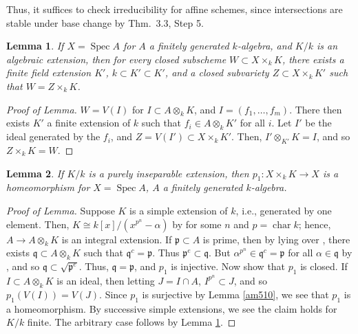 \documentclass[12pt,letterpaper]{article}
\newtheorem{lemma}{Lemma}
\theoremstyle{definition}
\theoremstyle{remark}
\numberwithin{equation}{section}
\numberwithin{figure}{problem}
\DeclareMathOperator{\Spec}{Spec}
\DeclareMathOperator{\Char}{char}
\begin{document}
Thus, it suffices to check irreducibility for affine schemes, since intersections are stable under base change by Thm.~3.3, Step 5.
\begin{lemma}\label{finext}
  If $X = \Spec A$ for $A$ a finitely generated $k$-algebra, and $K/k$ is an algebraic extension, then for every closed subscheme $W \subset X \times_k K$, there exists a finite field extension $K'$, $k \subset K' \subset K'$, and a closed subvariety $Z \subset X \times_k K'$ such that $W = Z \times_k K$.
\end{lemma}
\begin{proof}[Proof of Lemma]
  $W = V(I)$ for $I \subset A \otimes_k K$, and $I = (f_1,\ldots,f_m)$. There then exists $K'$ a finite extension of $k$ such that $f_i \in A \otimes_k K'$ for all $i$. Let $I'$ be the ideal generated by the $f_i$, and $Z = V(I') \subset X \times_k K'$. Then, $I' \otimes_{K'} K = I$, and so $Z \times_k K = W$.
\end{proof}
\begin{lemma}\label{purinsep}
  If $K/k$ is a purely inseparable extension, then $p_1\colon X \times_k K \to X$ is a homeomorphism for $X = \Spec A$, $A$ a finitely generated $k$-algebra.
\end{lemma}
\begin{proof}[Proof of Lemma]
  Suppose $K$ is a simple extension of $k$, i.e., generated by one element. Then, $K \cong k[x]/(x^{p^n}-\alpha)$ by \cite[Thm.~19.10]{Isa09} for some $n$ and $p = \Char k$; hence, $A \to A \otimes_k K$ is an integral extension. If $\mathfrak{p} \subset A$ is prime, then by lying over \cite[Thm.~5.10]{AM69}, there exists $\mathfrak{q} \subset A \otimes_k K$ such that $\mathfrak{q}^c = \mathfrak{p}$. Thus $\mathfrak{p}^e \subset \mathfrak{q}$. But $\alpha^{p^n} \in \mathfrak{q}^c = \mathfrak{p}$ for all $\alpha \in \mathfrak{q}$ by \cite[Thm.~19.10]{Isa09}, and so $\mathfrak{q} \subset \sqrt{\mathfrak{p}^e}$. Thus, $\mathfrak{q} = \mathfrak{p}$, and $p_1$ is injective. Now show that $p_1$ is closed. If $I \subset A \otimes_k K$ is an ideal, then letting $J = I \cap A$, $I^{p^n} \subset J$, and so $p_1(V(I)) = V(J)$. Since $p_1$ is surjective by Lemma \ref{am510}, we see that $p_1$ is a homeomorphism. By successive simple extensions, we see the claim holds for $K/k$ finite. The arbitrary case follows by Lemma \ref{finext}.
\end{proof}
\end{document}
